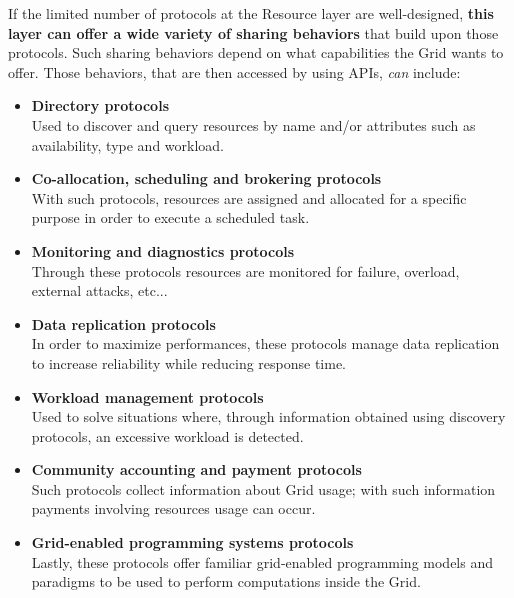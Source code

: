 If the limited number of protocols at the Resource layer are well-designed, \textbf{this layer can offer a wide variety of sharing behaviors} that build upon those protocols. Such sharing behaviors depend on what capabilities the Grid wants to offer. Those behaviors, that are then accessed by using APIs, \textit{can} include:
\begin{itemize}
    \item \textbf{Directory protocols}\\
    Used to discover and query resources by name and/or attributes such as availability, type and workload.
    \item \textbf{Co-allocation, scheduling and brokering protocols}\\
    With such protocols, resources are assigned and allocated for a specific purpose in order to execute a scheduled task.
    \item \textbf{Monitoring and diagnostics protocols}\\
    Through these protocols resources are monitored for failure, overload, external attacks, etc...
    \item \textbf{Data replication protocols}\\
    In order to maximize performances, these protocols manage data replication to increase reliability while reducing response time.
    \item \textbf{Workload management protocols}\\
    Used to solve situations where, through information obtained using discovery protocols, an excessive workload is detected.
    \item \textbf{Community accounting and payment protocols}\\
    Such protocols collect information about Grid usage; with such information payments involving resources usage can occur.
    \item \textbf{Grid-enabled programming systems protocols}\\
    Lastly, these protocols offer familiar grid-enabled programming models and paradigms to be used to perform computations inside the Grid. 
\end{itemize}

